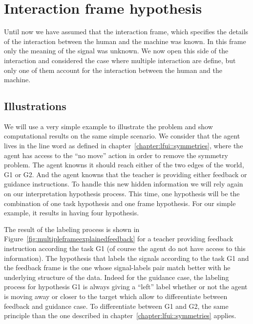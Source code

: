 
\section{Interaction frame hypothesis}
\label{chapter:limitations:framehypothesis}


Until now we have assumed that the interaction frame, which specifies the details of the interaction between the human and the machine was known. In this frame only the meaning of the signal was unknown. We now open this side of the interaction and considered the case where multiple interaction are define, but only one of them account for the interaction between the human and the machine.

\subsection{Illustrations}

We will use a very simple example to illustrate the problem and show computational results on the same simple scenario. We consider that the agent lives in the line word as defined in chapter~\ref{chapter:lfui::symmetries}, where the agent has access to the ``no move'' action in order to remove the symmetry problem. The agent knowns it should reach either of the two edges of the world, G1 or G2. And the agent knowns that the teacher is providing either feedback or guidance instructions. To handle this new hidden information we will rely again on our interpretation hypothesis process. This time, one hypothesis will be the combination of one task hypothesis and one frame hypothesis.  For our simple example, it results in having four hypothesis.

The result of the labeling process is shown in Figure~\ref{fig:multipleframeexplainedfeedback} for a teacher providing feedback instruction according the task G1 (of course the agent do not have access to this information). The hypothesis that labels the signals according to the task G1 and the feedback frame is the one whose signal-labels pair match better with he underlying structure of the data. Indeed for the guidance case, the labeling process for hypothesis G1 is always giving a ``left'' label whether or not the agent is moving away or closer to the target which allow to differentiate between feedback and guidance case. To differentiate between G1 and G2, the same principle than the one described in chapter~\ref{chapter:lfui::symmetries} applies.

